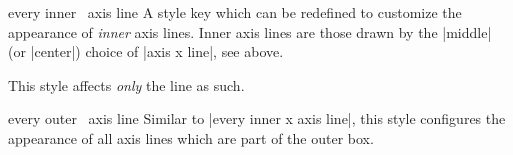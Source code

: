 \begin{pgfplotsxykey}{every inner \x\ axis line}
	A style key which can be redefined to customize the appearance of \emph{inner} axis lines. Inner axis lines are those drawn by the |middle| (or |center|) choice of |axis x line|, see above.

	This style affects \emph{only} the line as such.
\begin{codeexample}[]
\end{codeexample}
\end{pgfplotsxykey}

\begin{pgfplotsxykey}{every outer \x\ axis line}
	Similar to |every inner x axis line|, this style configures the appearance of all axis lines which are part of the outer box.
\begin{codeexample}[]
\end{codeexample}
\end{pgfplotsxykey}

